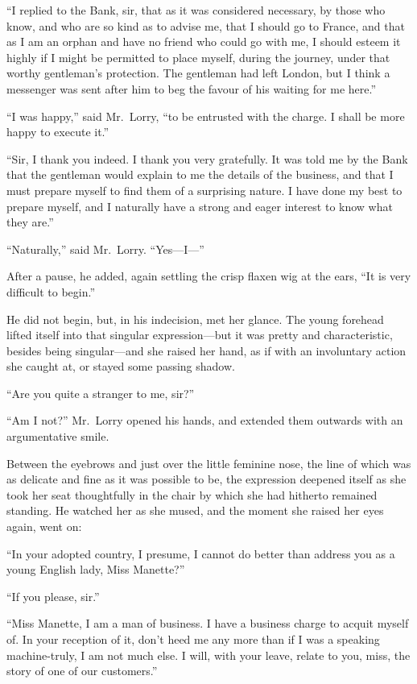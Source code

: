``I replied to the Bank, sir, that as it was considered necessary, by
those who know, and who are so kind as to advise me, that I should go
to France, and that as I am an orphan and have no friend who could go
with me, I should esteem it highly if I might be permitted to place
myself, during the journey, under that worthy gentleman's protection.
The gentleman had left London, but I think a messenger was sent after
him to beg the favour of his waiting for me here.''

``I was happy,'' said Mr.\ Lorry, ``to be entrusted with the charge.
I shall be more happy to execute it.''

``Sir, I thank you indeed.  I thank you very gratefully.  It was told
me by the Bank that the gentleman would explain to me the details of
the business, and that I must prepare myself to find them of a
surprising nature.  I have done my best to prepare myself, and I
naturally have a strong and eager interest to know what they are.''

``Naturally,'' said Mr.\ Lorry.  ``Yes---I---''

After a pause, he added, again settling the crisp flaxen wig at the ears,
``It is very difficult to begin.''

He did not begin, but, in his indecision, met her glance.  The young
forehead lifted itself into that singular expression---but it was
pretty and characteristic, besides being singular---and she raised
her hand, as if with an involuntary action she caught at, or stayed
some passing shadow.

``Are you quite a stranger to me, sir?''

``Am I not?''  Mr.\ Lorry opened his hands, and extended them outwards
with an argumentative smile.

Between the eyebrows and just over the little feminine nose, the line
of which was as delicate and fine as it was possible to be, the
expression deepened itself as she took her seat thoughtfully in the
chair by which she had hitherto remained standing.  He watched her as
she mused, and the moment she raised her eyes again, went on:

``In your adopted country, I presume, I cannot do better than address
you as a young English lady, Miss Manette?''

``If you please, sir.''

``Miss Manette, I am a man of business.  I have a business charge to
acquit myself of.  In your reception of it, don't heed me any more
than if I was a speaking machine-truly, I am not much else.  I will,
with your leave, relate to you, miss, the story of one of our
customers.''


